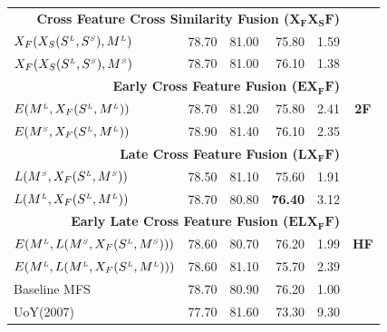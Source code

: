 \begin{table}[htp!]
\begin{tabular}{@{}lrrrrc@{}}
 \midrule
                   \multicolumn{5}{r}{\textbf{Cross Feature Cross Similarity Fusion ($\mathbf{X_FX_SF}$)}}  & \multirow{9}{*}{\textbf{2F}}     \\ %
	   
       $X_F(X_S(S^{\scriptscriptstyle L}, S^{\scriptscriptstyle S}), M^{\scriptscriptstyle L})$		& 78.70 & 81.00 & 75.80 & 1.59 \\	   
       $X_F(X_S(S^{\scriptscriptstyle L}, S^{\scriptscriptstyle S}), M^{\scriptscriptstyle S})$		& 78.70 & 81.00 & 76.10 & 1.38\\	   
                   \multicolumn{5}{r}{\textbf{Early Cross Feature Fusion ($\mathbf{EX_FF}$)}}       \\ %
       
       $E(M^{\scriptscriptstyle L}, X_F(S^{\scriptscriptstyle L}, M^{\scriptscriptstyle L}))$		&78.70 & 81.20 & 75.80 & 2.41\\	   
	   $E(M^{\scriptscriptstyle S}, X_F(S^{\scriptscriptstyle L}, M^{\scriptscriptstyle L}))$		& 78.90 & 81.40 & 76.10 & 2.35\\	   
                   \multicolumn{5}{r}{\textbf{Late Cross Feature Fusion ($\mathbf{LX_FF}$)}}       \\ %
	   $L(M^{\scriptscriptstyle S}, X_F(S^{\scriptscriptstyle L}, M^{\scriptscriptstyle S}))$		& 78.50 & 81.10 & 75.60 & 1.91\\	   
	   $L(M^{\scriptscriptstyle L}, X_F(S^{\scriptscriptstyle L}, M^{\scriptscriptstyle L}))$		& 78.70 & 80.80 & \textbf{76.40} & 3.12\\	   
       \midrule
                   \multicolumn{5}{r}{\textbf{Early Late Cross Feature Fusion ($\mathbf{ELX_FF}$)}}     & \multirow{3}{*}{\textbf{HF}}  \\ %
	   $E(M^{\scriptscriptstyle L}, L(M^{\scriptscriptstyle S}, X_F(S^{\scriptscriptstyle L}, M^{\scriptscriptstyle S})))$		& 78.60 & 80.70 & 76.20 & 1.99\\	   
	   $E(M^{\scriptscriptstyle L}, L(M^{\scriptscriptstyle L}, X_F(S^{\scriptscriptstyle L}, M^{\scriptscriptstyle L})))$		& 78.60 & 81.10 & 75.70 & 2.39\\
	   \midrule
	   \midrule
	   

	   Baseline MFS		& 78.70 & 80.90 & 76.20 & 1.00\\ 	   	 	    
	   UoY(2007)& 77.70 & 81.60 & 73.30 & 9.30\\ 	 		   
       \bottomrule
\end{tabular}
\end{table}


